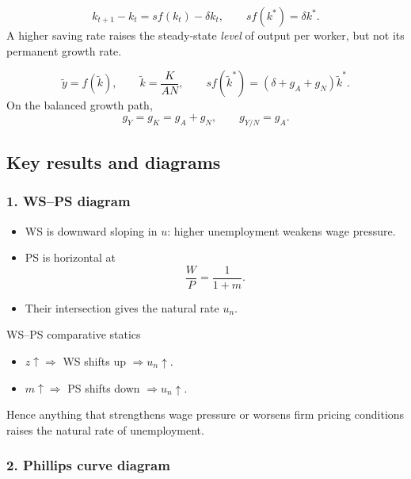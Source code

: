 \documentclass[12pt]{article}
\begin{document}
\begin{keyformula}[title={Key Formula: Solow without technology}]
\[
k_{t+1}-k_t=sf(k_t)-\delta k_t,
\qquad
sf(k^*)=\delta k^*.
\]
A higher saving rate raises the steady-state \emph{level} of output per worker, but not its permanent growth rate.
\end{keyformula}

\begin{keyformula}[title={Key Formula: Solow with technology}]
\[
\tilde{y}=f(\tilde{k}),
\qquad
\tilde{k}=\frac{K}{AN},
\qquad
sf(\tilde{k}^*)=(\delta+g_A+g_N)\tilde{k}^*.
\]
On the balanced growth path,
\[
g_Y=g_K=g_A+g_N,
\qquad
g_{Y/N}=g_A.
\]
\end{keyformula}

\subsection{Key results and diagrams}

\subsubsection*{1. WS--PS diagram}

\begin{itemize}[leftmargin=1.5em]
    \item WS is downward sloping in $u$: higher unemployment weakens wage pressure.
    \item PS is horizontal at
    \[
    \frac{W}{P}=\frac{1}{1+m}.
    \]
    \item Their intersection gives the natural rate $u_n$.
\end{itemize}

\begin{theorem}{WS--PS comparative statics}{}
\begin{itemize}[leftmargin=1.5em]
    \item $z\uparrow \Rightarrow$ WS shifts up $\Rightarrow u_n\uparrow$.
    \item $m\uparrow \Rightarrow$ PS shifts down $\Rightarrow u_n\uparrow$.
\end{itemize}
Hence anything that strengthens wage pressure or worsens firm pricing conditions raises the natural rate of unemployment.
\end{theorem}

\subsubsection*{2. Phillips curve diagram}
\end{document}
